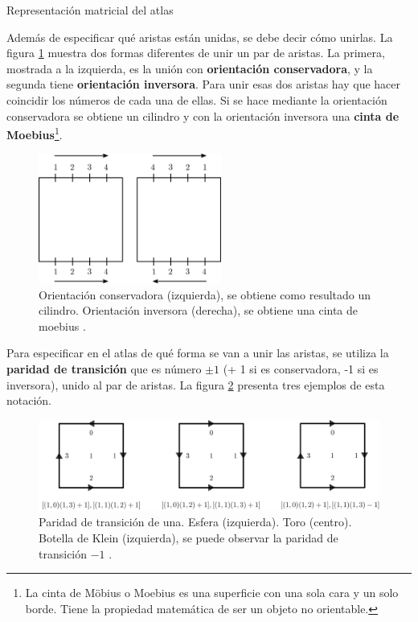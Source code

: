 \begin{center}
\footnotesize{Representación matricial del atlas}
\end{center}

Además de especificar qué aristas están unidas, se debe decir cómo unirlas. La figura \ref{fig:atlas0} muestra dos formas diferentes de unir un par de aristas. La primera, mostrada a la izquierda, es la unión con \textbf{orientación conservadora}, y la segunda tiene \textbf{orientación inversora}. Para unir esas dos aristas hay que hacer coincidir los números de cada una de ellas. Si se hace mediante la orientación conservadora se obtiene un cilindro y con la orientación inversora una \textbf{cinta de Moebius}\footnote{La cinta de Möbius o Moebius es una superficie con una sola cara y un solo borde. Tiene la propiedad matemática de ser un objeto no orientable.}.

\begin{figure}[h]
\includegraphics[width=6cm]{Img/GEO/geo-atlas1.jpg}
\centering
\caption{\footnotesize{Orientación conservadora (izquierda), se obtiene como resultado un cilindro. Orientación inversora (derecha), se obtiene una cinta de moebius \citep{Ramos2011}.}}
\label{fig:atlas0}
\end{figure}

Para especificar en el atlas de qué forma se van a unir las aristas, se utiliza la \textbf{paridad de transición} que es número $\pm 1$ (+ 1 si es conservadora, -1 si es inversora), unido al par de aristas. La figura \ref{fig:atlas1} presenta tres ejemplos de esta notación.

\begin{figure}[h]
\includegraphics[width=15cm]{Img/GEO/atlas3.jpg}
\centering
\caption{\footnotesize{Paridad de transición de una. Esfera (izquierda). Toro (centro). Botella de Klein (izquierda), se puede observar la paridad de transición $-1$ \citep{Ramos2011}.}}
\label{fig:atlas1}
\end{figure}

